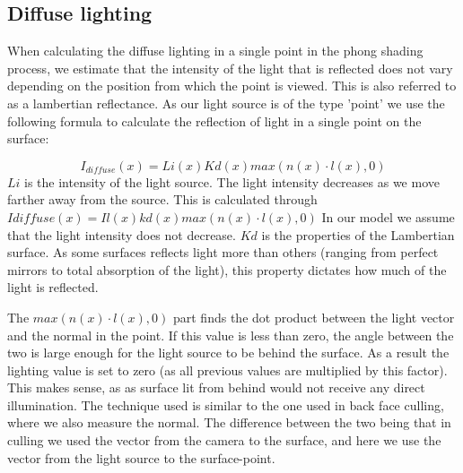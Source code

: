 \subsection{Diffuse lighting}
When calculating the diffuse lighting in a single point in the phong shading
process, we estimate that the intensity of the light that is reflected does not
vary depending on the position from which the point is viewed. This is also
referred to as a lambertian reflectance. As our light source is of the type
'point' we use the following formula to calculate the reflection of light in a
single point on the surface:

$$I_{diffuse}(x) = Li(x) Kd(x) max(n(x) · l(x), 0)$$ $Li$ is the intensity of
the light source. The light intensity decreases as we move farther away from
the source. This is calculated through $Idiffuse(x) = Il(x) kd(x) max(n(x) ·
l(x), 0)$ In our model we assume that the light intensity does not decrease.
$Kd$ is the properties of the Lambertian surface. As some surfaces reflects
light more than others (ranging from perfect mirrors to total absorption of the
light), this property dictates how much of the light is reflected.

The $max(n(x) · l(x), 0)$ part finds the dot product between the light vector
and the normal in the point. If this value is less than zero, the angle between
the two is large enough for the light source to be behind the surface. As a
result the lighting value is set to zero (as all previous values are multiplied
by this factor). This makes sense, as as surface lit from behind would not
receive any direct illumination. The technique used is similar to the one used
in back face culling, where we also measure the normal. The difference between
the two being that in culling we used the vector from the camera to the
surface, and here we use the vector from the light source to the surface-point. 
